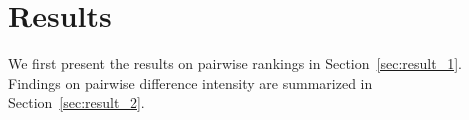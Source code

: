\section{Results}
We first present the results on pairwise rankings in Section~\ref{sec:result_1}. Findings on pairwise difference intensity are summarized in Section~\ref{sec:result_2}.


